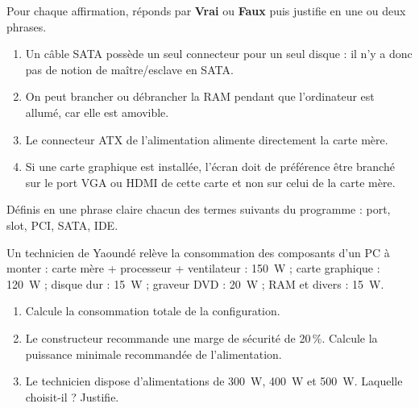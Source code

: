 \documentclass[11pt]{article}
\newcommand{\cle}[1]{{\popxbold\color{popdark}#1}}
\newcounter{popsec}
\newcounter{popsub}
\newcommand{\courssub}[1]{%
  \stepcounter{popsub}%
  \par\vspace{9pt}\noindent{\popxbold\fontsize{11.5}{13}\selectfont\color{popink}{\color{poporange}\thepopsec.\thepopsub}\hspace{6pt}#1}\par\nopagebreak\vspace{4pt}
}
\begin{document}
\begin{exercice}
Pour chaque affirmation, réponds par \textbf{Vrai} ou \textbf{Faux} puis justifie en une ou deux phrases.
\begin{enumerate}
  \item Un câble SATA possède un seul connecteur pour un seul disque : il n'y a donc pas de notion de maître/esclave en SATA.
  \item On peut brancher ou débrancher la RAM pendant que l'ordinateur est allumé, car elle est amovible.
  \item Le connecteur ATX de l'alimentation alimente directement la carte mère.
  \item Si une carte graphique est installée, l'écran doit de préférence être branché sur le port VGA ou HDMI de cette carte et non sur celui de la carte mère.
\end{enumerate}
\end{exercice}

\begin{exercice}[Définitions]
Définis en une phrase claire chacun des termes suivants du programme : \cle{port}, \cle{slot}, \cle{PCI}, \cle{SATA}, \cle{IDE}.
\end{exercice}

\begin{exercice}
Un technicien de Yaoundé relève la consommation des composants d'un PC à monter : carte mère + processeur + ventilateur : \SI{150}{W} ; carte graphique : \SI{120}{W} ; disque dur : \SI{15}{W} ; graveur DVD : \SI{20}{W} ; RAM et divers : \SI{15}{W}.
\begin{enumerate}
  \item Calcule la consommation totale de la configuration.
  \item Le constructeur recommande une marge de sécurité de 20\,\%. Calcule la puissance minimale recommandée de l'alimentation.
  \item Le technicien dispose d'alimentations de \SI{300}{W}, \SI{400}{W} et \SI{500}{W}. Laquelle choisit-il ? Justifie.
\end{enumerate}
\end{exercice}

\courssub{Je m'entraîne}
\end{document}
